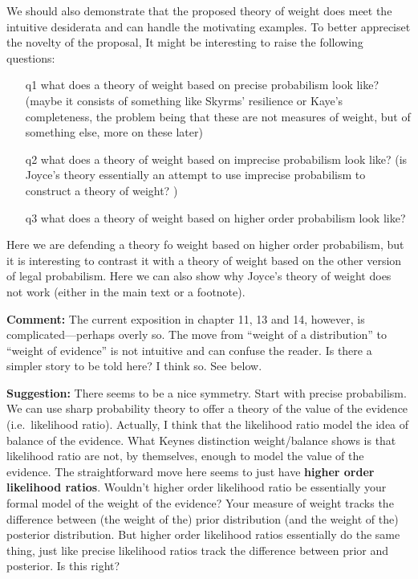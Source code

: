 \documentclass[
  10pt,
  dvipsnames,enabledeprecatedfontcommands]{scrartcl}
\begin{document}
We should also demonstrate that the proposed theory of weight does meet
the intuitive desiderata and can handle the motivating examples. To
better appreciset the novelty of the proposal, It might be interesting
to raise the following questions:

\begin{itemize}

\item[q1] what does a theory of weight based on precise probabilism look like? (maybe it consists of something like Skyrms' resilience or Kaye's completeness, the problem being that these are not measures of weight, but of something else, more on these later)

\item[q2] what does a theory of weight based on imprecise probabilism look like? (is Joyce's theory essentially an attempt to use imprecise probabilism to construct a theory of weight? )

\item[q3] what does a theory of weight based on higher order probabilism look like?

\end{itemize}

Here we are defending a theory fo weight based on higher order
probabilism, but it is interesting to contrast it with a theory of
weight based on the other version of legal probabilism. Here we can also
show why Joyce's theory of weight does not work (either in the main text
or a footnote).

\textbf{Comment:} The current exposition in chapter 11, 13 and 14,
however, is complicated---perhaps overly so. The move from ``weight of a
distribution'' to ``weight of evidence'' is not intuitive and can
confuse the reader. Is there a simpler story to be told here? I think
so. See below.

\textbf{Suggestion:} There seems to be a nice symmetry. Start with
precise probabilism. We can use sharp probability theory to offer a
theory of the value of the evidence (i.e.~likelihood ratio). Actually, I
think that the likelihood ratio model the idea of balance of the
evidence. What Keynes distinction weight/balance shows is that
likelihood ratio are not, by themselves, enough to model the value of
the evidence. The straightforward move here seems to just have
\textbf{higher order likelihood ratios}. Wouldn't higher order
likelihood ratio be essentially your formal model of the weight of the
evidence? Your measure of weight tracks the difference between (the
weight of the) prior distribution (and the weight of the) posterior
distribution. But higher order likelihood ratios essentially do the same
thing, just like precise likelihood ratios track the difference between
prior and posterior. Is this right? 
\end{document}
